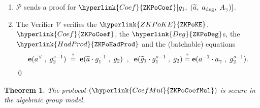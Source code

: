 \documentclass[11pt, lettersize, notitlepage, leqno, footskip=0.6cm]{article}
\newcommand{\wti}{\widetilde}
\newcommand{\mc}{\mathcal}
\newcommand{\mbf}{\mathbf}
\newcommand{\mP}{\mc{P}}
\newcommand{\V}{\mc{V}}
\newcommand{\vs}{\vspace{-0.15cm}}
\newcommand{\sta}{\stackrel{?}{=}}
\newcommand{\e}{\mbf{e}}
\newtheorem{Thm}{Theorem}[section]
\numberwithin{equation}{section}
\begin{document}
\begin{mdframed}
\begin{enumerate}[wide, labelwidth=!, labelindent=0pt, itemsep=-0.2ex]
\item $\mP$ sends a proof for $\hyperlink{Coef}{\tt{ZKPoCoef}}[g_1,\;(\wti{a},\; a_{\deg},\; A_{\gamma})] $.

\item The Verifier $\V$ verifies the $\hyperlink{ZKPoKE}{\tt{ZKPoKE}}$, $\hyperlink{Coef}{\tt{ZKPoCoef}}$, the $\hyperlink{Deg}{\tt{ZKPoDeg}}$s, the $\hyperlink{HadProd}{\tt{ZKPoHadProd}}$ and the (batchable) equations \vs $$ \e(a^{\vee}\;,\;g_2^{s-1})\;\sta\; \e(\wti{a}\cdot g_1^{-1}\;,\;g_2)\;\;,\;\;\e(\wti{g}_1\cdot g_1^{s-1}\;,\;g_2)\sta \e(a^{-1}\cdot a_{\gamma}\;,\;g_2^{s-1}). \vspace{-3mm} $$ \qed \end{enumerate} \end{mdframed} 


\vspace{2mm}



\begin{Thm} The protocol $(\hyperlink{CoefMul}{\tt{ZKPoCoefMul}})$ is secure in the algebraic group model. \end{Thm}
\end{document}
